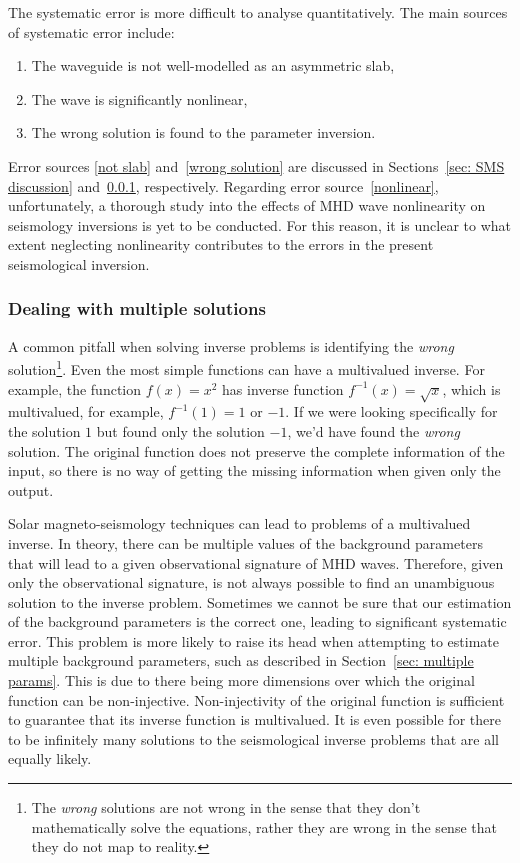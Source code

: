 \documentclass[12pt]{../style-files/ociamthesis}
\begin{document}
The systematic error is more difficult to analyse quantitatively. The main sources of systematic error include:
\begin{enumerate}
	\item The waveguide is not well-modelled as an asymmetric slab, \label{not slab}
	\item The wave is significantly nonlinear, \label{nonlinear}
	\item The wrong solution is found to the parameter inversion. \label{wrong solution}
\end{enumerate}
Error sources \ref{not slab} and~\ref{wrong solution} are discussed in Sections~\ref{sec: SMS discussion} and~\ref{sec: multiple roots}, respectively. Regarding error source~\ref{nonlinear}, unfortunately, a thorough study into the effects of MHD wave nonlinearity on seismology inversions is yet to be conducted. For this reason, it is unclear to what extent neglecting nonlinearity contributes to the errors in the present seismological inversion.


\subsubsection{Dealing with multiple solutions} \label{sec: multiple roots}

A common pitfall when solving inverse problems is identifying the \textit{wrong} solution\footnote{The \textit{wrong} solutions are not wrong in the sense that they don't mathematically solve the equations, rather they are wrong in the sense that they do not map to reality.}. Even the most simple functions can have a multivalued inverse. For example, the function $f(x) = x^2$ has inverse function $f^{-1}(x) = \sqrt{x}$, which is multivalued, for example, $f^{-1}(1) = 1$ or $-1$. If we were looking specifically for the solution $1$ but found only the solution $-1$, we'd have found the \textit{wrong} solution. The original function does not preserve the complete information of the input, so there is no way of getting the missing information when given only the output.

Solar magneto-seismology techniques can lead to problems of a multivalued inverse. In theory, there can be multiple values of the background parameters that will lead to a given observational signature of MHD waves. Therefore, given only the observational signature, is not always possible to find an unambiguous solution to the inverse problem. Sometimes we cannot be sure that our estimation of the background parameters is the correct one, leading to significant systematic error. This problem is more likely to raise its head when attempting to estimate multiple background parameters, such as described in Section~\ref{sec: multiple params}. This is due to there being more dimensions over which the original function can be non-injective. Non-injectivity of the original function is sufficient to guarantee that its inverse function is multivalued. It is even possible for there to be infinitely many solutions to the seismological inverse problems that are all equally likely.
\end{document}
